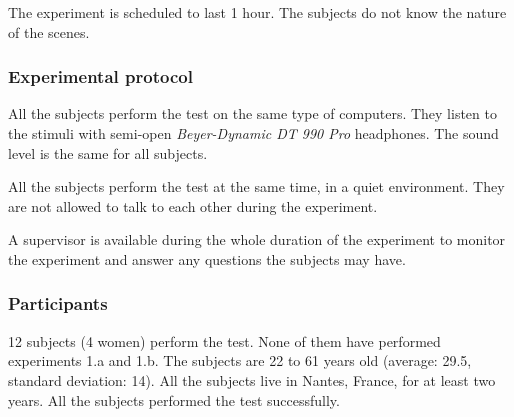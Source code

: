 \documentclass[twoside,twocolumn]{article}
\begin{document}
The experiment is scheduled to last 1 hour. The subjects do not know the nature of the scenes.

\subsubsection*{Experimental protocol}


All the subjects perform the test on the same type of computers. They listen to the stimuli with semi-open \emph{Beyer-Dynamic DT 990 Pro} headphones. The sound level is the same for all subjects.


All the subjects perform the test at the same time, in a quiet environment. They are not allowed to talk to each other during the experiment.


A supervisor is available during the whole duration of the experiment to monitor the experiment and answer any questions the subjects may have.

\subsubsection*{Participants}


12 subjects (4 women) perform the test. None of them have performed experiments 1.a and 1.b. The subjects are 22 to 61 years old (average: 29.5, standard deviation: 14). All the subjects live in Nantes, France, for at least two years. All the subjects performed the test successfully.
\end{document}
